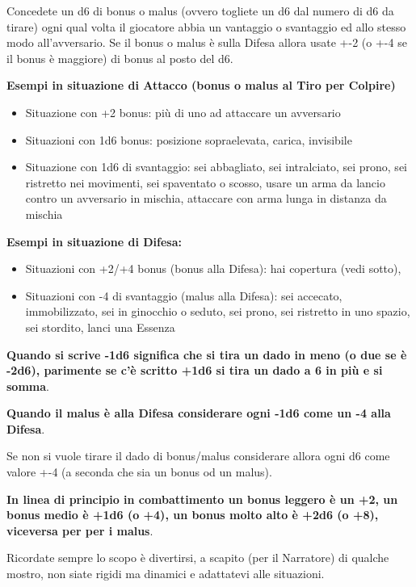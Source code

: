 \documentclass[a4paper,11pt,twoside,openany]{book}
\begin{document}
Concedete un d6 di bonus o malus (ovvero togliete un d6 dal numero di d6 da tirare) ogni qual volta il giocatore abbia un vantaggio o svantaggio ed allo stesso modo all'avversario. Se il bonus o malus è sulla Difesa allora usate +-2 (o +-4 se il bonus è maggiore) di bonus al posto del d6.

\bigskip

\textbf{Esempi in situazione di Attacco (bonus o malus al Tiro per Colpire)}

\begin{itemize}
	\item Situazione con +2 bonus: più di uno ad attaccare un avversario

	\item Situazioni con 1d6 bonus: posizione sopraelevata, carica, invisibile

	\item Situazione con 1d6 di svantaggio: sei abbagliato, sei intralciato, sei prono, sei ristretto nei movimenti, sei spaventato o scosso, usare un arma da lancio contro un avversario in mischia, attaccare con arma lunga in distanza da mischia
\end{itemize}

\textbf{Esempi in situazione di Difesa:}

\begin{itemize}
	\item Situazioni con +2/+4 bonus (bonus alla Difesa): hai copertura (vedi sotto),

	\item Situazioni con -4 di svantaggio (malus alla Difesa): sei accecato, immobilizzato, sei in ginocchio o seduto, sei prono, sei ristretto in uno spazio, sei stordito, lanci una Essenza
\end{itemize}

\textbf{Quando si scrive -1d6 significa che si tira un dado in meno (o due se è -2d6), parimente se c'è scritto +1d6 si tira un dado a 6 in più e si somma}.

\textbf{Quando il malus è alla Difesa considerare ogni -1d6 come un -4 alla Difesa}.

Se non si vuole tirare il dado di bonus/malus considerare allora ogni d6 come valore +-4 (a seconda che sia un bonus od un malus).

\textbf{In linea di principio in combattimento un bonus leggero è un +2, un bonus medio è +1d6 (o +4), un bonus molto alto è +2d6 (o +8), viceversa per per i malus}.

\bigskip
Ricordate sempre lo scopo è divertirsi, a scapito (per il Narratore) di qualche mostro, non siate rigidi ma dinamici e adattatevi alle situazioni.
\end{document}
